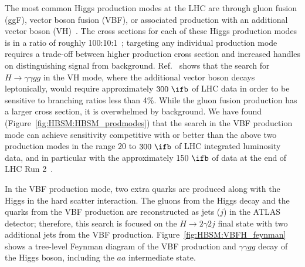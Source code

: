 The most common Higgs production modes at the LHC are through gluon fusion (ggF), vector boson fusion (VBF), or associated production with an additional vector boson (VH)~\cite{Dittmaier:2011ti}.
The cross sections for each of these Higgs production modes is in a ratio of roughly 100:10:1~\cite{deFlorian:2016spz}; targeting any individual production mode requires a trade-off between higher production cross section and increased handles on distinguishing signal from background.
Ref.~\cite{hep-ph/0703247} shows that the search for $H \to \gamma\gamma gg$ in the VH mode, 
where the additional vector boson
decays leptonically, would require approximately $300~\ifb$ of LHC data in order to be sensitive to branching ratios less than 4\%. 
While the gluon fusion production has a larger cross section, it is overwhelmed by background.
We have found (Figure~\ref{fig:HBSM:HBSM_prodmodes}) that the search in the VBF production 
mode can achieve sensitivity competitive with or better than the above two production modes in the range $20$ to $300~\ifb$ of LHC integrated luminosity data,
and in particular with the approximately $150~\ifb$ of data at the end of LHC Run 2~\cite{lhc-commissioning}.

In the VBF production mode, two extra quarks are produced along with the Higgs in the hard scatter interaction.
The gluons from the Higgs decay and the quarks from the VBF production are reconstructed as jets ($j$) in the ATLAS detector;
therefore, this search is focused on the $H\to2\gamma2j$ final state with two additional jets from the VBF production.
Figure~\ref{fig:HBSM:VBFH_feynman} shows a tree-level Feynman diagram of the VBF production and $\gamma\gamma gg$ decay of the Higgs boson, including the $aa$ intermediate state.


